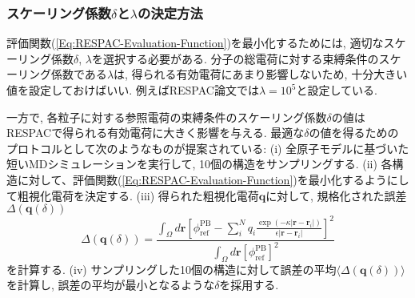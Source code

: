 \subsubsection{スケーリング係数$\delta$と$\lambda$の決定方法}
評価関数(\ref{Eq:RESPAC-Evaluation-Function})を最小化するためには, 適切なスケーリング係数$\delta$, $\lambda$を選択する必要がある.
分子の総電荷に対する束縛条件のスケーリング係数である$\lambda$は, 得られる有効電荷にあまり影響しないため, 十分大きい値を設定しておけばいい. 例えばRESPAC論文では$\lambda = 10^{5}$と設定している.

一方で, 各粒子に対する参照電荷の束縛条件のスケーリング係数$\delta$の値はRESPACで得られる有効電荷に大きく影響を与える.
最適な$\delta$の値を得るためのプロトコルとして次のようなものが提案されている:
(i) 全原子モデルに基づいた短いMDシミュレーションを実行して, 10個の構造をサンプリングする.
(ii) 各構造に対して、評価関数(\ref{Eq:RESPAC-Evaluation-Function})を最小化するようにして粗視化電荷を決定する.
(iii) 得られた粗視化電荷$\bm{q}$に対して, 規格化された誤差$\Delta (\bm{q}(\delta))$
\begin{equation}
    \Delta (\bm{q}(\delta))
    =
    \frac
    {\int_{\Omega} d\bm{r}
        \left[
            \phi_{\mathrm{ref}}^{\mathrm{PB}}
            -
            \sum_{i}^{N} q_{i}
            \frac{\exp(-\kappa |\bm{r} - \bm{r}_{i}|)}{\epsilon |\bm{r} - \bm{r}_{i}|}
        \right]^{2}
    }
    {
        \int_{\Omega} d\bm{r}[\phi_{\mathrm{ref}}^{\mathrm{PB}}]^{2}
    }
\end{equation}
を計算する.
(iv) サンプリングした10個の構造に対して誤差の平均$\langle \Delta (\bm{q}(\delta)) \rangle$を計算し, 誤差の平均が最小となるような$\delta$を採用する.









